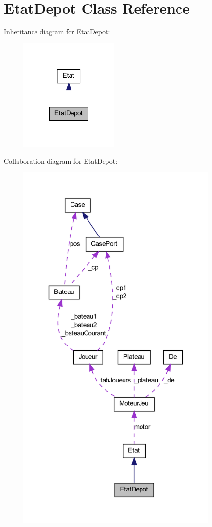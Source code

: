 \hypertarget{class_etat_depot}{
\section{EtatDepot Class Reference}
\label{class_etat_depot}
}


Inheritance diagram for EtatDepot:
\nopagebreak
\begin{figure}[H]
\begin{center}
\leavevmode
\includegraphics[width=140pt]{class_etat_depot__inherit__graph}
\end{center}
\end{figure}


Collaboration diagram for EtatDepot:
\nopagebreak
\begin{figure}[H]
\begin{center}
\leavevmode
\includegraphics[width=285pt]{class_etat_depot__coll__graph}
\end{center}
\end{figure}

